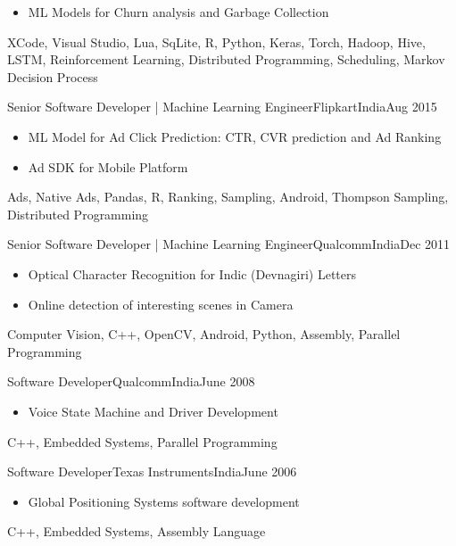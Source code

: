 \begin{experiences}
{\begin{itemize}
  	\item ML Models for Churn analysis and Garbage Collection
  \end{itemize}
	}
  {XCode, Visual Studio, Lua, SqLite, R, Python, Keras, Torch, Hadoop, Hive, LSTM, Reinforcement Learning, Distributed Programming, Scheduling, Markov Decision Process}
  \emptySeparator
  
   {Senior Software Developer | Machine Learning Engineer}{Flipkart}{India}{Aug 2015}    
  {
  	\begin{itemize}
  		
  		\item ML Model for Ad Click Prediction: CTR, CVR prediction and Ad Ranking
  		
  		\item Ad SDK for Mobile Platform
  	\end{itemize}
  }
{ Ads, Native Ads, Pandas, R, Ranking, Sampling, Android, Thompson Sampling, Distributed Programming}
\emptySeparator

   {Senior Software Developer | Machine Learning Engineer}{Qualcomm}{India}{Dec 2011}    
  {
	\begin{itemize}
		\item Optical Character Recognition for Indic (Devnagiri) Letters
		\item Online detection of interesting scenes in Camera
	\end{itemize}
  }
  { Computer Vision, C++, OpenCV, Android, Python, Assembly, Parallel Programming}
  
  \emptySeparator
 
   {Software Developer}{Qualcomm}{India}{June 2008}    
	{
		\begin{itemize}
			\item Voice State Machine and Driver Development
		\end{itemize}
	}
	{ C++, Embedded Systems, Parallel Programming}

  \emptySeparator  
   {Software Developer}{Texas Instruments}{India}{June 2006}    
	{
		\begin{itemize}
			\item Global Positioning Systems software development
		\end{itemize}
	}
	{ C++, Embedded Systems, Assembly Language}  	
	  
\emptySeparator
  
\end{experiences}
